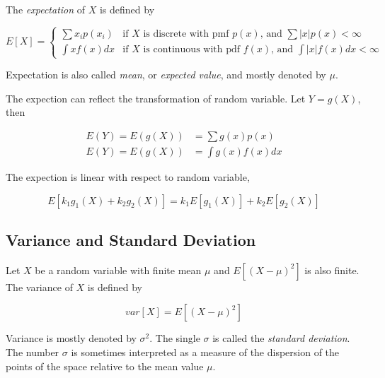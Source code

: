 \documentclass{article}
\begin{document}
            The \textit{expectation} of $ X $ is defined by

            \begin{equation}
                E[X]=\left\{
                    \begin{array}{ll}
                        \sum x_i p(x_{i}) & \text{if } X \text{ is discrete with pmf } p(x) \text{, and }
                            \sum |x| p(x) < \infty \\
                        \int x f(x) dx & \text{if } X \text{ is continuous with pdf } f(x) \text{, and }
                            \int |x| f(x) dx < \infty
                    \end{array}
                \right.
            \end{equation}

            Expectation is also called \textit{mean}, or \textit{expected value},
            and mostly denoted by $ \mu $.

            The expection can reflect the transformation of random variable. Let $ Y = g(X) $, then

            \begin{align*}
                E(Y) = E ( g(X) ) &= \sum g(x) p(x) \\
                E(Y) = E ( g(X) ) &= \int g(x) f(x) dx
            \end{align*}

            The expection is linear with respect to random variable,

            \begin{equation*}
                E [ k_{1} g_{1}(X) + k_{2} g_{2}(X) ] = k_{1} E [ g_{1}(X) ] + k_{2} E [ g_{2}(X) ]
            \end{equation*}

        \subsection{Variance and Standard Deviation}

            Let $ X $ be a random variable with finite mean $ \mu $ and $ E [ (X -
            \mu)^{2} ] $ is also finite. The variance of $ X $ is defined by

            \begin{equation}
                var[ X ] = E [ (X - \mu)^{2} ]
            \end{equation}

            Variance is mostly denoted by $ \sigma^{2} $. The single $ \sigma $ is
            called the \textit{standard deviation}. The number $ \sigma $ is sometimes
            interpreted as a measure of the dispersion of the points of the space
            relative to the mean value $ \mu $.
\end{document}
